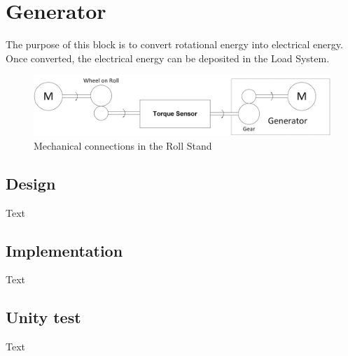 \section{Generator}
The purpose of this block is to convert rotational energy into electrical energy. Once converted, the electrical energy can be deposited in the Load System.

\begin{figure}[H]
	\centering
	\includegraphics[width=0.8\linewidth]{Hardware/Pictures/Mechanical_Connections}
	\caption{Mechanical connections in the Roll Stand}
	\label{fig:Mec_Con}
\end{figure}

\subsection{Design}
Text

\subsection{Implementation}
Text

\subsection{Unity test}
Text